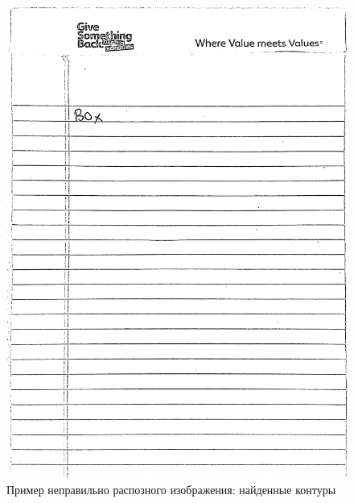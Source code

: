\begin{figure}
    \includegraphics[scale=0.15]{img/perspective/wrong_output.JPG}
    \caption{Пример неправильно распозного изображения: найденные контуры}
    \label{perspective_wrong_output}
\end{figure}